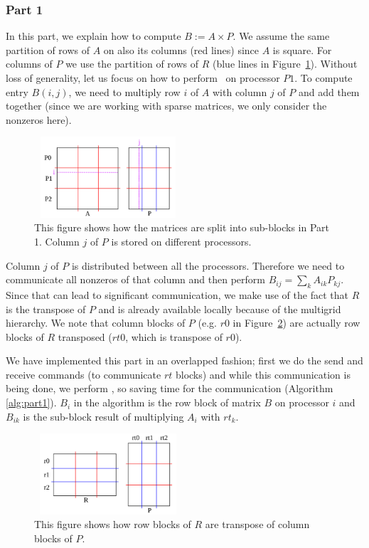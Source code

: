 \subsubsection{Part 1}

In this part, we explain how to compute $B := A \times P$. We assume the same partition of rows of $A$ on also its columns (red lines) since $A$ is square. For columns of $P$ we use the partition of rows of $R$ (blue lines in Figure~\ref{fig:part1b}).
Without loss of generality, let us focus on how to perform \mm ~on processor $P1$. To compute entry $B(i, j)$, we need to multiply row $i$ of $A$ with column $j$ of $P$ and add them together (since we are working with sparse matrices, we only consider the nonzeros here).

\begin{figure}[tbh]
 \centering
 \includegraphics[width=5.5cm,height=3cm]{./figures/part1b.pdf}
 \caption{This figure shows how the matrices are split into sub-blocks in Part 1. Column $j$ of $P$ is stored on different processors.}
 \label{fig:part1b}
\end{figure}

Column $j$ of $P$ is distributed between all the processors. Therefore we need to communicate all nonzeros of that column and then perform $B_{ij} = \sum_{k} A_{ik} P_{kj}$. Since that can lead to significant communication, we make use of the fact that $R$ is the transpose of $P$ and is already available locally because of the multigrid hierarchy. We note that column blocks of $P$ (e.g. $r0$ in Figure~\ref{fig:part1c}) are actually row blocks of $R$ transposed ($rt0$, which is transpose of $r0$).

We have implemented this part in an overlapped fashion; first we do the send and receive commands (to communicate $rt$ blocks) and while this communication is being done, we perform \mm, so saving time for the communication (Algorithm \ref{alg:part1}). $B_{i}$ in the algorithm is the row block of matrix $B$ on processor $i$ and $B_{ik}$ is the sub-block result of multiplying $A_i$ with $rt_k$.

\begin{figure}[tbh]
 \centering
 \includegraphics[width=5.5cm,height=3cm]{./figures/part1c.pdf}
 \caption{This figure shows how row blocks of $R$ are transpose of column blocks of $P$.}
 \label{fig:part1c}
\end{figure}

